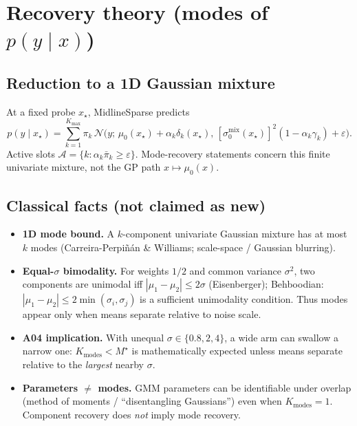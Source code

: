 \documentclass[11pt,a4paper]{article}
\newcommand{\Ncal}{\mathcal{N}}
\newcommand{\Kmodes}{K_{\mathrm{modes}}}
\newcommand{\Kmax}{K_{\max}}
\begin{document}
\section{Recovery theory (modes of \(p(y\mid x)\))}

\subsection{Reduction to a 1D Gaussian mixture}
At a fixed probe \(x_\star\), MidlineSparse predicts
\begin{equation}
  p(y\mid x_\star)
  =
  \sum_{k=1}^{\Kmax}
  \pi_k\,
  \Ncal\!\bigl(
    y;\,
    \mu_0(x_\star)+\alpha_k\delta_k(x_\star),\,
    [\sigma_0^{\mathrm{mix}}(x_\star)]^2(1-\alpha_k\gamma_k)+\varepsilon
  \bigr).
\end{equation}
Active slots \(\mathcal A=\{k:\alpha_k\bar\pi_k\ge\varepsilon\}\).
Mode-recovery statements concern this finite univariate mixture, not the GP path \(x\mapsto\mu_0(x)\).

\subsection{Classical facts (not claimed as new)}
\begin{itemize}[leftmargin=*]
  \item \textbf{1D mode bound.} A \(k\)-component univariate Gaussian mixture has at most
        \(k\) modes (Carreira-Perpi\~{n}\'{a}n \& Williams; scale-space / Gaussian blurring).
  \item \textbf{Equal-\(\sigma\) bimodality.} For weights \(1/2\) and common variance \(\sigma^2\),
        two components are unimodal iff \(|\mu_1-\mu_2|\le 2\sigma\) (Eisenberger);
        Behboodian: \(|\mu_1-\mu_2|\le 2\min(\sigma_i,\sigma_j)\) is a sufficient unimodality
        condition. Thus modes appear only when means separate relative to noise scale.
  \item \textbf{A04 implication.} With unequal \(\sigma\in\{0.8,2,4\}\), a wide arm can
        swallow a narrow one: \(\Kmodes<M^\star\) is mathematically expected unless means
        separate relative to the \emph{largest} nearby \(\sigma\).
  \item \textbf{Parameters \(\neq\) modes.} GMM parameters can be identifiable under overlap
        (method of moments / ``disentangling Gaussians'') even when \(\Kmodes=1\).
        Component recovery does \emph{not} imply mode recovery.
\end{itemize}
\end{document}
